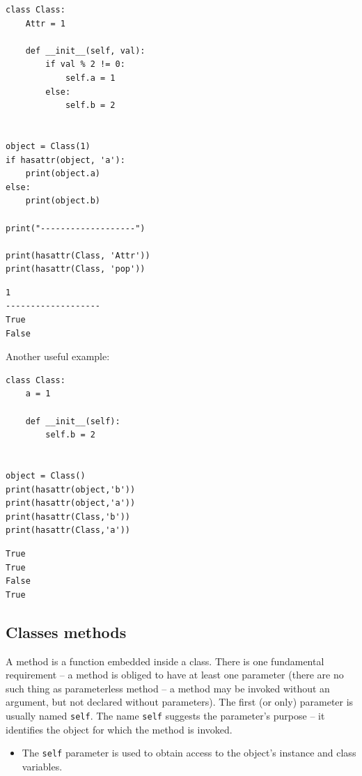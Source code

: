 \documentclass[11pt]{article}
\begin{document}
\begin{verbatim}
class Class:
	Attr = 1

	def __init__(self, val):
		if val % 2 != 0:
			self.a = 1
		else:
			self.b = 2


object = Class(1)
if hasattr(object, 'a'):
	print(object.a)
else:
	print(object.b)

print("-------------------")

print(hasattr(Class, 'Attr'))
print(hasattr(Class, 'pop'))

\end{verbatim}

\begin{verbatim}
1
-------------------
True
False
\end{verbatim}

\break
\newline

Another useful example:

\begin{verbatim}
class Class:
	a = 1

	def __init__(self):
		self.b = 2


object = Class()
print(hasattr(object,'b'))
print(hasattr(object,'a'))
print(hasattr(Class,'b'))
print(hasattr(Class,'a'))

\end{verbatim}

\begin{verbatim}
True
True
False
True
\end{verbatim}
\newpage

\subsection{Classes methods}
\label{sec:orgbc9760c}
A method is a function embedded inside a class. There is one
fundamental requirement – a method is obliged to have at least one
parameter (there are no such thing as parameterless method – a method
may be invoked without an argument, but not declared without
parameters). The first (or only) parameter is usually named
\texttt{self}. The name \texttt{self} suggests the parameter’s purpose – it
identifies the object for which the method is invoked. 

\begin{itemize}
\item The \texttt{self} parameter is used to obtain access to the object’s
instance and class variables.
\end{itemize}
\end{document}
